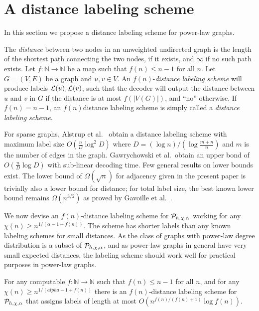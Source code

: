 \section{A distance labeling scheme}\label{Sec:Distance}
In this section we propose a distance labeling scheme for power-law graphs. 

The \emph{distance} between two nodes in an unweighted undirected graph is the length of the shortest path connecting
the two nodes, if it exists, and $\infty$ if no such path exists. Let $f : \mathbb{N} \longrightarrow \mathbb{N}$ be a map such that
$f(n) \leq  n -1$ for all $n$.
Let $G=(V,E)$ be a graph and  $u,v \in V$.
An $f(n)$-\emph{distance labeling scheme}  will produce labels $ \mathcal{L}(u), \mathcal{L}(v)$, such that the decoder will output the distance between $u$ and $v$ in $G$ if the distance is at most $f(\vert V(G) \vert)$, and ``no'' otherwise. 
If $f(n) = n-1$, an $f(n)$distance labeling scheme is simply called a \emph{distance labeling scheme}.

For sparse graphs,
Alstrup et al.\ \cite{DBLP:journals/corr/AlstrupDKP15} obtain a distance labeling scheme with maximum label size
$O(\frac{n}{D} \log^2 D)$ where $D = (\log n)/(\log \frac{m+n}{n})$ and $m$ is the number of edges
in the graph.   Gawrychowski et al.\ obtain an upper bond of \cite{DBLP:journals/corr/GawrychowskiKU15}
$O(\frac{n}{D} \log D)$ with sub-linear decoding time. Few general results on lower bounds exist. The lower bound of $\Omega(\sqrt{n})$ for adjacency given in the present paper is trivially also a lower bound for distance; for total label size, the best known lower bound remains $\Omega(n^{3/2})$ as proved by Gavoille et al.~\cite{Gavoille2001}.

We now devise an $f(n)$-distance labeling scheme for $ \mathcal{P}_{h,\chi,\alpha}$ working for any $\chi(n) \geq n^{1/(\alpha - 1 +f(n))}$.
The scheme has shorter labels than any known labeling schemes for small distances. As
the class of graphs with power-law degree distribution is a subset of $ \mathcal{P}_{h,\chi,\alpha}$, and as power-law graphs in general
have very small expected distances, the labeling scheme should work well for practical purposes in power-law graphs.

\begin{lemma}\label{lem:sparse_small_dist}
For any computable $f : \mathbb{N} \longrightarrow \mathbb{N}$ such that
$f(n) \leq n -1$ for all $n$, and for any $\chi(n) \geq n^{1/(alpha-1+f(n))}$ there is an $f(n)$-distance labeling scheme for $ \mathcal{P}_{h,\chi,\alpha}$
that assigns labels of length at most $O(n^{f(n)/(f(n) + 1)} \log f(n))$.
\end{lemma}

